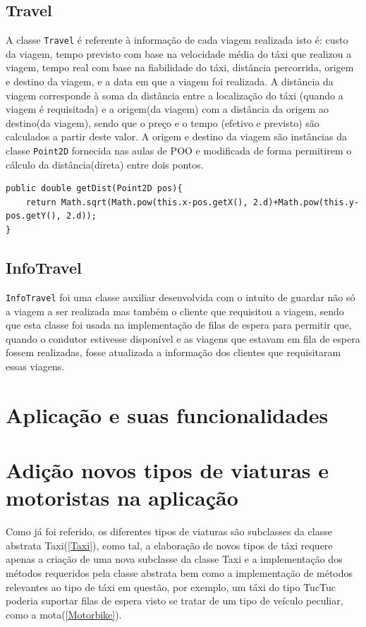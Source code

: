 \documentclass[a4paper,10pt,portuguese]{article}
\begin{document}
\subsection{Travel}
A classe \texttt{Travel} é referente à informação de cada viagem realizada isto é: custo da viagem, tempo previsto com base na velocidade média do táxi que realizou a viagem, tempo real com base na fiabilidade do táxi, distância percorrida, origem e destino da viagem, e a data em que a viagem foi realizada. A distância da viagem corresponde à soma da distância entre a localização do táxi (quando a viagem é requisitada) e a origem(da viagem) com a distância da origem ao destino(da viagem), sendo que o preço e o tempo (efetivo e previsto) são calculados a partir deste valor. A origem e destino da viagem são instâncias da classe \texttt{Point2D} fornecida nas aulas de POO e modificada de forma permitirem o cálculo da distância(direta) entre dois pontos.
\begin{verbatim}
public double getDist(Point2D pos){
    return Math.sqrt(Math.pow(this.x-pos.getX(), 2.d)+Math.pow(this.y-pos.getY(), 2.d));
}
\end{verbatim}

\subsection{InfoTravel}
\label{InfoTravel}
\texttt{InfoTravel} foi uma classe auxiliar desenvolvida com o intuito de guardar não só a viagem a ser realizada mas também o cliente que requisitou a viagem, sendo que esta classe foi usada na implementação de filas de espera para permitir que, quando o condutor estivesse disponível e as viagens que estavam em fila de espera fossem realizadas, fosse atualizada a informação dos clientes que requisitaram essas viagens.

\section{Aplicação e suas funcionalidades}

\section{Adição novos tipos de viaturas e motoristas na aplicação}
Como já foi referido, os diferentes tipos de viaturas são subclasses da classe abstrata Taxi(\ref{Taxi}), como tal, a elaboração de novos tipos de táxi requere apenas a criação de uma nova subclasse da classe Taxi e a implementação dos métodos requeridos pela classe abstrata bem como a implementação de métodos relevantes ao tipo de táxi em questão, por exemplo, um táxi do tipo TucTuc poderia suportar filas de espera visto se tratar de um tipo de veículo peculiar, como a mota(\ref{Motorbike}).
\end{document}
